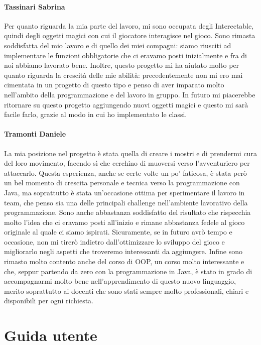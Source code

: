 \documentclass{report}
\begin{document}
\subsubsection{Tassinari Sabrina}
Per quanto riguarda la mia parte del lavoro, mi sono occupata degli Interectable, quindi degli oggetti magici con cui il giocatore interagisce nel gioco.
%
Sono rimasta soddisfatta del mio lavoro e di quello dei miei compagni: siamo riusciti ad implementare le funzioni obbligatorie che ci eravamo posti inizialmente e fra di noi abbiamo lavorato bene. 
%
Inoltre, questo progetto mi ha aiutato molto per quanto riguarda la crescità delle mie abilità: precedentemente non mi ero mai cimentata in un progetto di questo tipo e penso di aver imparato molto nell'ambito della programmazione e del lavoro in gruppo.
%
In futuro mi piacerebbe ritornare su questo progetto aggiungendo nuovi oggetti magici e questo mi sarà facile farlo, grazie al modo in cui ho implementato le classi.
%
 

\subsubsection{Tramonti Daniele}
La mia posizione nel progetto è stata quella di creare i mostri e di prendermi cura del loro movimento, facendo sì che cerchino di muoversi verso l'avventuriero per attaccarlo.
%
Questa esperienza, anche se certe volte un po' faticosa, è stata però un bel momento di crescita personale e tecnica verso la programmazione con Java, ma soprattutto è stata un'occasione
%
ottima per sperimentare il lavoro in team, che penso sia una delle principali challenge nell'ambiente lavorativo della programmazione. Sono anche abbastanza soddisfatto del risultato che 
%
rispecchia molto l'idea che ci eravamo posti all'inizio e rimane abbastanza fedele al gioco originale al quale ci siamo ispirati. Sicuramente, se in futuro avrò tempo e occasione, non mi tirerò
%
indietro dall'ottimizzare lo sviluppo del gioco e migliorarlo negli aspetti che troveremo interessanti da aggiungere. Infine sono rimasto molto contento anche del corso di OOP, un corso molto
%
interessante e che, seppur partendo da zero con la programmazione in Java, è stato in grado di accompagnarmi molto bene nell'apprendimento di questo nuovo linguaggio, merito soprattutto ai docenti
%
che sono stati sempre molto professionali, chiari e disponibili per ogni richiesta.

\appendix
\chapter{Guida utente}
\end{document}
